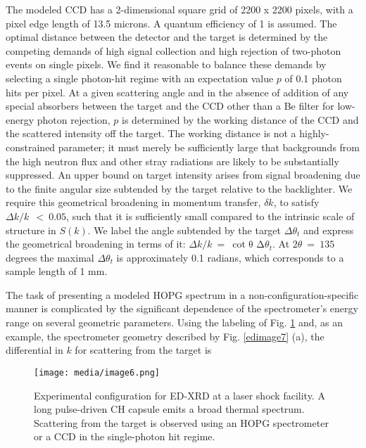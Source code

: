 \FloatBarrier

The modeled CCD has a 2-dimensional square grid of 2200 x 2200 pixels,
with a pixel edge length of 13.5 microns. A quantum efficiency of 1 is
assumed. The optimal distance between the detector and the target is
determined by the competing demands of high signal collection and high
rejection of two-photon events on single pixels. We find it reasonable
to balance these demands by selecting a single photon-hit regime with an
expectation value \(p\) of 0.1 photon hits per pixel. At a given
scattering angle and in the absence of addition of any special absorbers
between the target and the CCD other than a Be filter for low-energy
photon rejection, \(p\) is determined by the working distance of the CCD
and the scattered intensity off the target. The working distance is not
a highly-constrained parameter; it must merely be sufficiently large
that backgrounds from the high neutron flux and other stray radiations
are likely to be substantially suppressed. An upper bound on target
intensity arises from signal broadening due to the finite angular size
subtended by the target relative to the backlighter. We require this
geometrical broadening in momentum transfer, $\delta k$, to
satisfy \(\Delta k/k\ \  < \ 0.05\), such that it is sufficiently small
compared to the intrinsic scale of structure in \(S(k)\). We label the
angle subtended by the target \(\Delta\theta_{t}\) and express the
geometrical broadening in terms of it:
\(\Delta k/k\  = \ \cot{\text{θ\ Δ}\theta_{t}}.\) At
\(2\theta\  = \ 135\ \) degrees the maximal \(\Delta\theta_{t}\) is
approximately 0.1 radians, which corresponds to a sample length of 1 mm.

The task of presenting a modeled HOPG spectrum in a
non-configuration-specific manner is complicated by the significant
dependence of the spectrometer's energy range on several geometric
parameters. Using the labeling of Fig. \ref{edimage6} and, as an example, the
spectrometer geometry described by Fig. \ref{edimage7} (a), the differential in \(k\)
for scattering from the target is

\begin{figure}[h] 
\caption{ Experimental configuration
for ED-XRD at a laser shock facility. A long pulse-driven CH capsule
emits a broad thermal spectrum. Scattering from the target is observed
using an HOPG spectrometer or a CCD in the single-photon hit regime.}
\label{edimage6}
\centering
\texttt{[image: media/image6.png]}
\end{figure}

